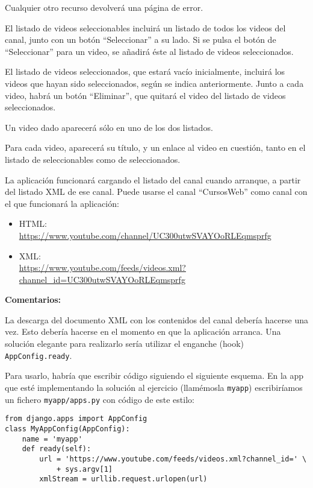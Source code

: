 Cualquier otro recurso devolverá una página de error.

El listado de videos seleccionables incluirá un listado de todos los videos del canal, junto con un botón ``Seleccionar'' a su lado. Si se pulsa el botón de ``Seleccionar'' para un video, se añadirá éste al listado de videos seleccionados.

El listado de videos seleccionados, que estará vacío inicialmente, incluirá los videos que hayan sido seleccionados, según se indica anteriormente. Junto a cada video, habrá un botón ``Eliminar'', que quitará el video del listado de videos seleccionados.

Un video dado aparecerá sólo en uno de los dos listados.

Para cada video, aparecerá su título, y un enlace al video en cuestión, tanto en el listado de seleccionables como de seleccionados.

La aplicación funcionará cargando el listado del canal cuando arranque, a partir del listado XML de ese canal. Puede usarse el canal ``CursosWeb'' como canal con el que funcionará la aplicación:

\begin{itemize}
\item HTML: \\
  \url{https://www.youtube.com/channel/UC300utwSVAYOoRLEqmsprfg}
\item XML: \\
  \url{https://www.youtube.com/feeds/videos.xml?channel_id=UC300utwSVAYOoRLEqmsprfg}
\end{itemize}

\textbf{Comentarios:}

La descarga del documento XML con los contenidos del canal debería hacerse una vez. Esto debería hacerse en el momento en que la aplicación arranca. Una solución elegante para realizarlo sería utilizar el enganche (hook) \verb|AppConfig.ready|.

Para usarlo, habría que escribir código siguiendo el siguiente esquema. En la app que esté implementando la solución al ejercicio (llamémosla \verb|myapp|) escribiríamos un fichero \verb|myapp/apps.py| con código de este estilo:

\begin{verbatim}
from django.apps import AppConfig
class MyAppConfig(AppConfig):
    name = 'myapp'
    def ready(self):
        url = 'https://www.youtube.com/feeds/videos.xml?channel_id=' \
            + sys.argv[1]
        xmlStream = urllib.request.urlopen(url)
\end{verbatim}


